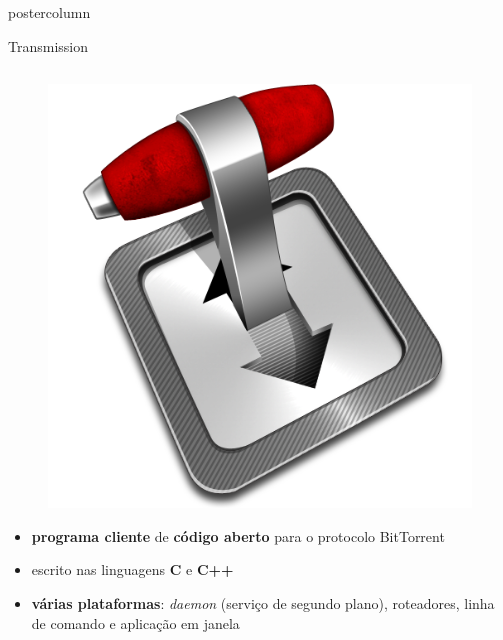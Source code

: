 \documentclass[final,brazil]{beamer}
\newenvironment{innercol}{
\begin{columns}
  \begin{column}{.93\textwidth}
    \justifying
}{
  \end{column}
\end{columns}
}
\begin{document}
\begin{frame}
\begin{columns}
\begin{column}{.245\textwidth}
\begin{beamercolorbox}[center,wd=\textwidth]{postercolumn}
\begin{minipage}[T]{.95\textwidth}
{            \begin{block}{Transmission}
              \begin{innercol}
                \begin{figure}
                  \vspace{-1ex}
                  \hspace{-1ex}
                  \includegraphics[width=\linewidth]{transmission.png}
                \end{figure}

                \begin{itemize}
                  \justifying
                  \vspace{-4ex}
                  \item \textbf{programa cliente} de \textbf{código aberto} para o
                    protocolo BitTorrent
                  \item escrito nas linguagens \textbf{C} e \textbf{C++}
                  \item \textbf{várias plataformas}: \emph{daemon} (serviço de segundo
                    plano), roteadores, linha de comando e aplicação em janela
                \end{itemize}
              \end{innercol}
            \end{block}

}
\end{minipage}
\end{beamercolorbox}
\end{column}
\end{columns}
\end{frame}
\end{document}
